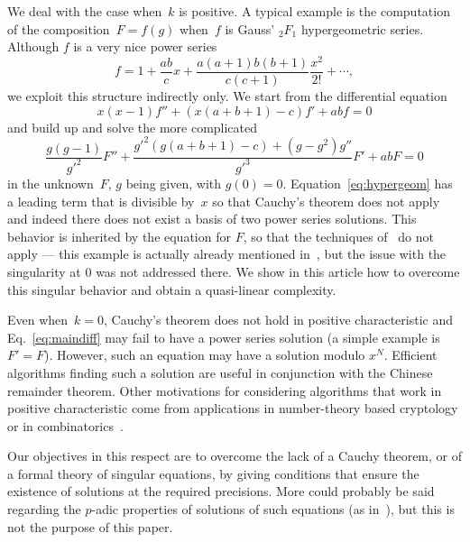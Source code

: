\documentclass[]{sig-alternate}
\begin{document}
\smallskip{}  We deal with the case
when~$k$ is positive. A typical example is the computation of the
composition~$F=f(g)$ when~$f$ is Gauss' ${}_2F_1$ hypergeometric
series. Although $f$ is a very nice power series
\[f=1+\frac{ab}{c}x+\frac{a(a+1)b(b+1)}{c(c+1)}\frac{x^2}{2!}+\dotsb,\]
we exploit this structure indirectly only. We start from the
differential equation
\begin{equation}\label{eq:hypergeom}
x(x-1)f''+(x(a+b+1)-c)f'+abf=0
\end{equation}
and build up and solve the more complicated
\begin{equation*}\label{eq:hypergeom2}
\frac{g(g-1)}{g'^2}F''+\frac{g'^2(g(a+b+1)-c)+(g-g^2)g''}{g'^3}F'+abF=0
\end{equation*}
in the unknown~$F$, $g$ being given, with
$g(0)=0$. Equation~\eqref{eq:hypergeom} has a leading term that is
divisible by~$x$ so that Cauchy's theorem does not apply and indeed
there does not exist a basis of two power series solutions. This
behavior is inherited by the equation for $F$, so that the techniques
of~\cite{BoChOlSaScSc07} do not apply --- this example is actually
already mentioned in~\cite{BrKu78}, but the issue with the singularity
at $0$ was not addressed there. We show in this article how to
overcome this singular behavior and obtain a quasi-linear complexity.

\smallskip{}  Even when~$k=0$,
Cauchy's theorem does not hold in positive characteristic and
Eq.~\eqref{eq:maindiff} may fail to have a power series solution (a
simple example is~$F'=F$). However, such an equation may have a
solution modulo $x^N$. Efficient algorithms finding such a solution
are useful in conjunction with the Chinese remainder theorem. Other
motivations for considering algorithms that work in positive
characteristic come from applications in number-theory based
cryptology or in
combinatorics~\cite{BostanMorainSalvySchost2008,BostanSalvySchost2008,BostanSchost2009}.

Our objectives in this respect are to overcome the lack of a Cauchy
theorem, or of a formal theory of singular equations, by giving
conditions that ensure the existence of solutions at the required
precisions. More could probably be said regarding the $p$-adic
properties of solutions of such equations (as
in~\cite{BoGoPeSc05,LeSi08}), but this is not the purpose of this
paper.
\end{document}
